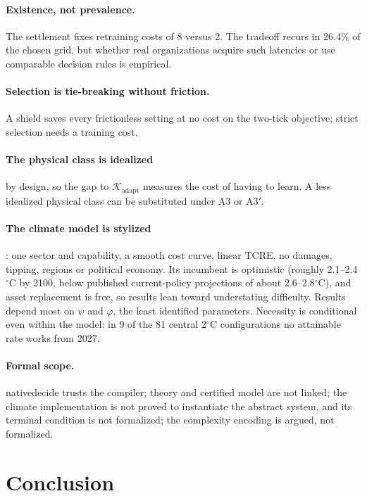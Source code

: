 \documentclass[11pt]{article}
\theoremstyle{plain}
\theoremstyle{definition}
\newcommand{\K}{\mathcal{K}}
\newcommand{\adapt}{\mathrm{adapt}}
\newcommand{\lean}[1]{{\ttfamily\renewcommand{\_}{\textunderscore\allowbreak}#1}}
\begin{document}
\paragraph{Existence, not prevalence.} The settlement fixes retraining costs of 8 versus 2. The tradeoff recurs in 26.4\% of the chosen grid, but whether real organizations acquire such latencies or use comparable decision rules is empirical.

\paragraph{Selection is tie-breaking without friction.} A shield saves every frictionless setting at no cost on the two-tick objective; strict selection needs a training cost.

\paragraph{The physical class is idealized} by design, so the gap to $\K_\adapt$ measures the cost of having to learn. A less idealized physical class can be substituted under A3 or A3$'$.

\paragraph{The climate model is stylized}: one sector and capability, a smooth cost curve, linear TCRE, no damages, tipping, regions or political economy. Its incumbent is optimistic (roughly 2.1--2.4$^\circ$C by 2100, below published current-policy projections of about 2.6--2.8$^\circ$C), and asset replacement is free, so results lean toward understating difficulty. Results depend most on $\psi$ and $\varphi$, the least identified parameters. Necessity is conditional even within the model: in 9 of the 81 central 2$^\circ$C configurations no attainable rate works from 2027.

\paragraph{Formal scope.} \lean{native\_decide} trusts the compiler; theory and certified model are not linked; the climate implementation is not proved to instantiate the abstract system, and its terminal condition is not formalized; the complexity encoding is argued, not formalized.

\section{Conclusion}
\label{sec:conclusion}
\end{document}
